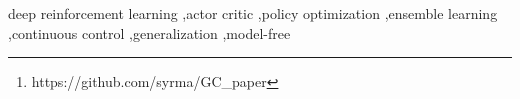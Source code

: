 \begin{abstract}
We present a general model for actor-critic policy gradient methods with Ensemble models, and test an example implementation on four robotic environments.

The source code implementing the present work can be consulted and accessed online\footnote{https://github.com/syrma/GC\_paper}.
\end{abstract}

\begin{keyword}
deep reinforcement learning \sep actor critic \sep policy optimization \sep ensemble learning \sep continuous control \sep generalization \sep model-free
\end{keyword}

